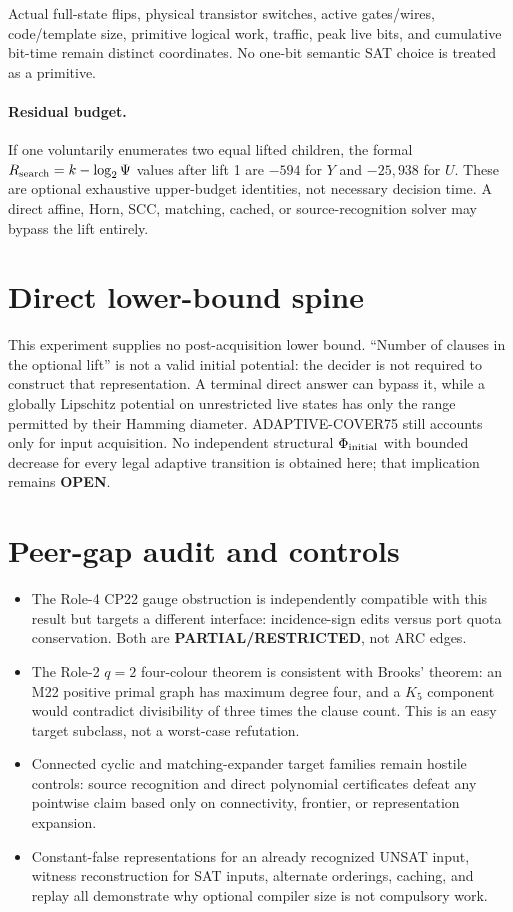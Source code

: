 \documentclass[11pt]{article}
\newcommand{\OPEN}{\textbf{OPEN}}
\begin{document}
Actual full-state flips, physical transistor switches, active gates/wires,
code/template size, primitive logical work, traffic, peak live bits, and
cumulative bit-time remain distinct coordinates.  No one-bit semantic SAT
choice is treated as a primitive.

\paragraph{Residual budget.}
If one voluntarily enumerates two equal lifted children, the formal
$R_{\rm search}=k-\log_2\Psi$ values after lift 1 are $-594$ for $Y$ and
$-25{,}938$ for $U$.  These are optional exhaustive upper-budget identities,
not necessary decision time.  A direct affine, Horn, SCC, matching, cached, or
source-recognition solver may bypass the lift entirely.

\section{Direct lower-bound spine}
This experiment supplies no post-acquisition lower bound.  ``Number of clauses
in the optional lift'' is not a valid initial potential: the decider is not
required to construct that representation.  A terminal direct answer can
bypass it, while a globally Lipschitz potential on unrestricted live states
has only the range permitted by their Hamming diameter.  ADAPTIVE-COVER75
still accounts only for input acquisition.  No independent structural
$\Phi_{\rm initial}$ with bounded decrease for every legal adaptive transition
is obtained here; that implication remains \OPEN.

\section{Peer-gap audit and controls}
\begin{itemize}
\item The Role-4 CP22 gauge obstruction is independently compatible with this
  result but targets a different interface: incidence-sign edits versus port
  quota conservation.  Both are \textbf{PARTIAL/RESTRICTED}, not ARC edges.
\item The Role-2 $q=2$ four-colour theorem is consistent with Brooks' theorem:
  an M22 positive primal graph has maximum degree four, and a $K_5$ component
  would contradict divisibility of three times the clause count.  This is an
  easy target subclass, not a worst-case refutation.
\item Connected cyclic and matching-expander target families remain hostile
  controls: source recognition and direct polynomial certificates defeat any
  pointwise claim based only on connectivity, frontier, or representation
  expansion.
\item Constant-false representations for an already recognized UNSAT input,
  witness reconstruction for SAT inputs, alternate orderings, caching, and
  replay all demonstrate why optional compiler size is not compulsory work.
\end{itemize}
\end{document}
